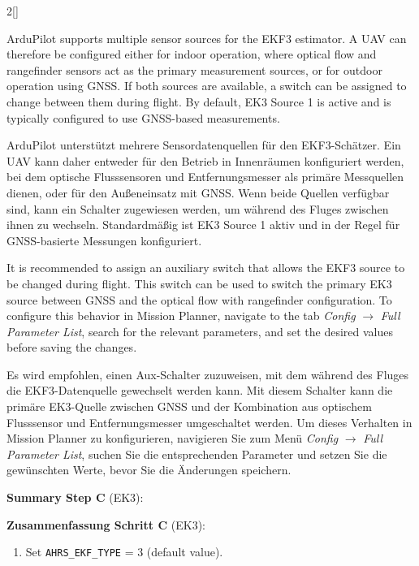 \begin{paracol}{2}[]
\coleng

ArduPilot supports multiple sensor sources for the EKF3 estimator. A UAV can therefore be configured either for indoor operation, where optical flow and rangefinder sensors act as the primary measurement sources, or for outdoor operation using GNSS. If both sources are available, a switch can be assigned to change between them during flight. By default, EK3 Source 1 is active and is typically configured to use GNSS-based measurements.

\colger

ArduPilot unterstützt mehrere Sensordatenquellen für den EKF3-Schätzer. Ein UAV kann daher entweder für den Betrieb in Innenräumen konfiguriert werden, bei dem optische Flusssensoren und Entfernungsmesser als primäre Messquellen dienen, oder für den Außeneinsatz mit GNSS. Wenn beide Quellen verfügbar sind, kann ein Schalter zugewiesen werden, um während des Fluges zwischen ihnen zu wechseln. Standardmäßig ist EK3 Source 1 aktiv und in der Regel für GNSS-basierte Messungen konfiguriert.

\coleng

It is recommended to assign an auxiliary switch that allows the EKF3 source to be changed during flight. This switch can be used to switch the primary EK3 source between GNSS and the optical flow with rangefinder configuration. To configure this behavior in Mission Planner, navigate to the tab \textit{Config} \(\longrightarrow\) \textit{Full Parameter List}, search for the relevant parameters, and set the desired values before saving the changes.

\colger

Es wird empfohlen, einen Aux-Schalter zuzuweisen, mit dem während des Fluges die EKF3-Datenquelle gewechselt werden kann. Mit diesem Schalter kann die primäre EK3-Quelle zwischen GNSS und der Kombination aus optischem Flusssensor und Entfernungsmesser umgeschaltet werden. Um dieses Verhalten in Mission Planner zu konfigurieren, navigieren Sie zum Menü \textit{Config} \(\longrightarrow\) \textit{Full Parameter List}, suchen Sie die entsprechenden Parameter und setzen Sie die gewünschten Werte, bevor Sie die Änderungen speichern.

\coleng

\textbf{Summary Step C} (EK3): 

\colger

\textbf{Zusammenfassung Schritt C} (EK3):

\coleng

\begin{enumerate} 
\item Set \texttt{AHRS\_EKF\_TYPE} = 3 (default value).
\end{enumerate} 


\end{paracol}
